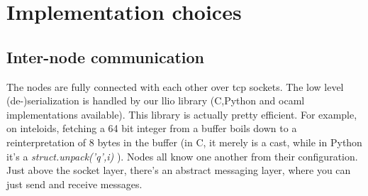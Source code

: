 \section{Implementation choices}
\subsection{Inter-node communication}
The nodes are fully connected with each other over tcp sockets.
The low level (de-)serialization is handled by our llio library (C,Python and ocaml implementations available).
This library is actually pretty efficient.
For example, on inteloids, fetching a 64 bit integer from a buffer boils down to a reinterpretation of 8 bytes in the buffer (in C, it merely is a cast, while in Python it's a \emph{struct.unpack('q',i)} ).
Nodes all know one another from their configuration.
Just above the socket layer, there's an abstract messaging layer, where you can just send and receive messages.



